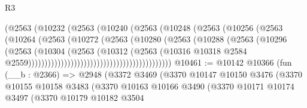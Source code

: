 \begin{lexlean}{R3}
\begin{coremodule}
                                            (@2563
                                              (@10232
                                                (@2563
                                                  (@10240
                                                    (@2563
                                                      (@10248
                                                        (@2563
                                                          (@10256
                                                            (@2563
                                                              (@10264
                                                                (@2563
                                                                  (@10272
                                                                    (@2563
                                                                      (@10280
                                                                        (@2563
                                                                          (@10288
                                                                            (@2563
                                                                              (@10296
                                                                                (@2563
                                                                                  (@10304
                                                                                    (@2563
                                                                                      (@10312
                                                                                        (@2563
                                                                                          (@10316
                                                                                            @10318
                                                                                            @2584
                                                                                            @2559))))))))))))))))))))))))))))))))))))))))))))
@10461 := @10142
    @10366
    (fun (__b : @2366) =>
    @2948
      (@3372
        @3469
        (@3370
          @10147
          @10150
          @3476
          (@3370
            @10155
            @10158
            @3483
            (@3370
              @10163
              @10166
              @3490
              (@3370
                @10171
                @10174
                @3497
                (@3370
                  @10179
                  @10182
                  @3504

\end{coremodule}
\end{lexlean}
